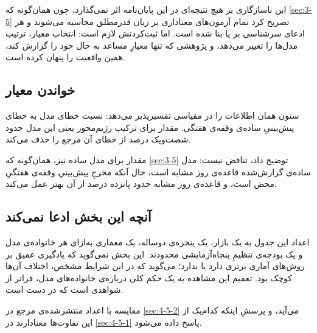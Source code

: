 این ناسازگاری بر هیچ نتیجه‌ای در این پایان‌نامه اثر نمی‌گذارد، چون  همان‌گونه
که \cref{sec:3-5} تصریح کرد  تمام آزمون‌های معناداری بر زیان قدرمطلق محاسبه می‌شوند و
هر ادعای سرشناسی بر  یا  بنا شده است. اما ثبت‌کردنش لازم است: انتخاب
معیار، ترتیب مدل‌ها را تغییر می‌دهد، و پژوهشی که تنها معیارِ مساعد به حال خود را
گزارش کند، همین واقعیت را پنهان کرده است.

\subsection*{خواندن معیار }

ستون  همان اطلاعات  را در مقیاسی تفسیرپذیر می‌دهد: نسبت خطای مدل به
خطای پیش‌بینیِ ساده‌ی وقفه‌ی هفتگی. مقدار  برای ترکیب رژیم‌محور یعنی این مدل
حدود شصت‌ویک درصد از خطای آن مرجع را حذف می‌کند.

مقدار  برای مدل ساده نیز، همان‌گونه که \cref{sec:3-5} توضیح داد، تناقض نیست: مدل
ساده‌ی گزارش‌شده قاعده‌ی روز مشابه است، حال آنکه مخرجِ  پیش‌بینیِ وقفه‌ی هفتگیِ
محض است، و قاعده‌ی روز مشابه حدود پانزده درصد از آن بهتر عمل می‌کند.

\subsection*{آنچه این بخش ادعا نمی‌کند}

اعداد این جدول به یک بازار، یک پنجره‌ی دوساله، یک معماری به‌ازای هر خانواده‌ی مدل و یک
بودجه‌ی تنظیمِ پنجاه‌آزمایشی محدودند. این بخش نمی‌گوید که یادگیری عمیق بر روش‌های آماری
برتری دارد یا ندارد؛ می‌گوید که در این شرایط مشخص، اختلاف آن‌ها کوچک بود. تعمیم این
مشاهده به یک حکم کلی درباره‌ی خانواده‌های مدل، فراتر از شواهدی است که در دست است.

مقایسه با اعداد منتشرشده‌ی مرجع در \cref{sec:4-5-2} می‌آید، و پرسشِ اینکه کدام‌یک از این
تفاوت‌ها معنادارند در \cref{sec:4-5-1} پاسخ داده می‌شود.
